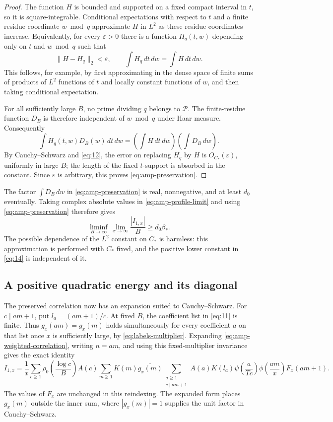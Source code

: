\begin{proof}
The function $H$ is bounded and supported on a fixed compact interval
in $t$, so it is square-integrable.
Conditional expectations with respect to $t$ and a finite
residue coordinate $w\bmod q$ approximate $H$ in $L^2$ as
these residue coordinates increase.  Equivalently, for every
$\varepsilon>0$ there is a function $H_q(t,w)$ depending only
on $t$ and $w\bmod q$ such that
\[
 \|H-H_q\|_2<\varepsilon,
 \qquad
 \int H_q\,dt\,dw=\int H\,dt\,dw.
\]
This follows, for example, by first approximating in the
dense space of finite sums of products of $L^2$ functions of
$t$ and locally constant functions of $w$, and then taking
conditional expectation.

For all sufficiently large $B$, no prime dividing $q$ belongs
to $\mathcal P$.  The finite-residue function $D_B$ is
therefore independent of $w\bmod q$ under Haar measure.
Consequently
\[
 \int H_q(t,w)D_B(w)\,dt\,dw
 =\left(\int H\,dt\,dw\right)\left(\int D_B\,dw\right).
\]
By Cauchy--Schwarz and \eqref{eq:12}, the error on replacing
$H_q$ by $H$ is $O_{C_*}(\varepsilon)$, uniformly in large
$B$; the length of the fixed $t$-support is absorbed in the
constant.  Since $\varepsilon$ is arbitrary, this proves
\eqref{eq:amp-preservation}.
\end{proof}

The factor $\int D_B\,dw$ in \eqref{eq:amp-preservation} is real,
nonnegative, and at
least $d_0$ eventually. Taking complex absolute values in
\eqref{eq:amp-profile-limit} and using \eqref{eq:amp-preservation}
therefore gives
\begin{equation}\label{eq:14}
 \liminf_{B\to\infty}\ \lim_{x\to\infty}
       \frac{|I_{1,x}|}{B}\ge d_0\beta_*.
\end{equation}
The possible dependence of the $L^2$ constant on $C_*$ is
harmless: this approximation is performed with $C_*$ fixed,
and the positive lower constant in \eqref{eq:14} is independent
of it.

\subsection{A positive quadratic energy and its diagonal}

The preserved correlation now has an expansion suited to
Cauchy--Schwarz. For $c\mid am+1$, put $l_a=(am+1)/c$. At fixed $B$,
the coefficient list in \eqref{eq:11} is finite. Thus
$g_x(am)=g_x(m)$ holds simultaneously for every coefficient $a$ on
that list once $x$ is sufficiently large, by
\eqref{eq:labels-multiplier}. Expanding
\eqref{eq:amp-weighted-correlation}, writing $n=am$, and using this
fixed-multiplier invariance gives the exact identity
\begin{equation}\label{eq:10}
 I_{1,x}=\frac1x\sum_{c\ge1}
   \rho_0\left(\frac{\log c}{B}\right)A(c)
   \sum_{m\ge1}K(m)\overline{g_x(m)}
   \sum_{\substack{a\ge1\\ c\mid am+1}}
   A(a)K(l_a)\psi\left(\frac{a}{Tc}\right)
   \phi\left(\frac{am}{x}\right)F_x(am+1).
\end{equation}
The values of $F_x$ are unchanged in this reindexing. The expanded
form places $g_x(m)$ outside the inner sum, where $|g_x(m)|=1$ supplies
the unit factor in Cauchy--Schwarz.

